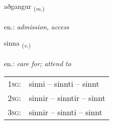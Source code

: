 \documentclass[frontgrid, backgrid]{flacards}\usepackage[]{graphicx}\usepackage[]{xcolor}
\begin{document}
\renewcommand{\flhead}{\vskip5pt \fboxsep=0pt {\small\bfseries\footnotesize Nafnorð | Noun}}
\renewcommand{\fcfoot}{\vskip5pt \fboxsep=0pt \hspace{2pt}{\small\bfseries\footnotesize 1K}}

\renewcommand{\blhead}{\vskip5pt {\small\bfseries\footnotesize Nafnorð | Noun }}
\renewcommand{\bcfoot}{\vskip5pt \hspace{2pt}{\small\bfseries\footnotesize 1K}}


{aðgangur \small{\textsubscript{(\textit{m.})}} \\[1ex] %
\textphonetic{[aðkauŋkʏr]} \\
en.: \emph{admission, access} \\  [2ex]
\renewcommand*{\arraystretch}{0.8}
}

\renewcommand{\flhead}{\vskip5pt \fboxsep=0pt {\small\bfseries\footnotesize Sagnorð | Verb}}
\renewcommand{\fcfoot}{\vskip5pt \fboxsep=0pt \hspace{2pt}{\small\bfseries\footnotesize 1K}}

\renewcommand{\blhead}{\vskip5pt {\small\bfseries\footnotesize Sagnorð | Verb }}
\renewcommand{\bcfoot}{\vskip5pt \hspace{2pt}{\small\bfseries\footnotesize 1K}}


{sinna \small{\textsubscript{(\textit{v.})}} \\[1ex] %
\textphonetic{[sɪna]} \\
en.: \emph{care for; attend to} \\  [2ex]
\renewcommand*{\arraystretch}{0.8}
\begin{tabular}{p{1cm}l}
\textsc{1sg}: & sinni -- sinnti -- sinnt \\ 
\textsc{2sg}: & sinnir -- sinntir -- sinnt \\ 
\textsc{3sg}: & sinnir -- sinnti -- sinnt \\ 
\end{tabular}
}
\end{document}

